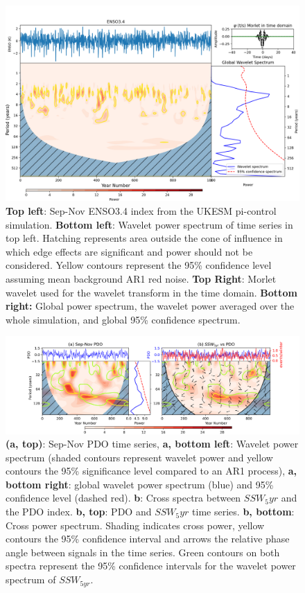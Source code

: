 \documentclass[wcd, manuscript]{copernicus}
\begin{document}
\begin{center}
\begin{figure}[h!]
\noindent\includegraphics[width = \linewidth]{new_changed_figures/ENSO_wavelet_new_levels.png}
\caption{\textbf{Top left}: Sep-Nov ENSO3.4 index from the UKESM pi-control simulation. \textbf{Bottom left}: Wavelet power spectrum of time series in top left. Hatching represents area outside the cone of influence in which edge effects are significant and power should not be considered. Yellow contours represent the 95\% confidence level assuming mean background AR1 red noise. \textbf{Top Right}: Morlet wavelet used for the wavelet transform in the time domain. \textbf{Bottom right:} Global power spectrum, the wavelet power averaged over the whole simulation, and global 95\% confidence spectrum.}
\label{fig3}
\end{figure}
\end{center}

\begin{center}
\begin{figure}[h!]
\noindent\includegraphics[width = \linewidth]{new_changed_figures/PDO_wavelet_combined_new_levels.png}
\caption{\textbf{(a, top)}: Sep-Nov PDO time series, \textbf{a, bottom left}: Wavelet power spectrum (shaded contours represent wavelet power and yellow contours the 95\% significance level compared to an AR1 process), \textbf{a, bottom right}: global wavelet power spectrum (blue) and 95\% confidence level (dashed red). \textbf{b}: Cross spectra between $SSW_5yr$ and the PDO index. \textbf{b, top}: PDO and $SSW_5yr$ time series. \textbf{b, bottom}: Cross power spectrum. Shading indicates cross power, yellow contours the 95\% confidence interval and arrows the relative phase angle between signals in the time series. Green contours on both spectra represent the 95\% confidence intervals for the wavelet power spectrum of $SSW_{5yr}$.}
\end{figure}
\end{center}
\end{document}
